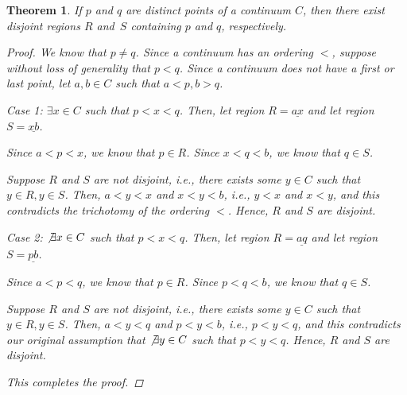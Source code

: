 \documentclass[11pt]{article}
\renewcommand{\_}[1]{\underline{ #1 }}
\newtheorem{theorem}{Theorem}[section]
\theoremstyle{definition}
\numberwithin{equation}{subsection}
\begin{document}
\begin{theorem}  If $p$ and $q$ are distinct points of a continuum $C$, then there exist disjoint regions $R$ and~$S$ containing $p$ and $q$, respectively.

\begin{proof}
We know that $p \not= q$. Since a continuum has an ordering $<$, suppose without loss of generality that $p < q$. Since a continuum does not have a first or last point, let $a,b \in C$ such that $a<p,b>q$.

Case 1: $\exists x \in C$ such that $p<x<q$. Then, let region $R = \_{ax}$ and let region $S = \_{xb}$. 

Since $a<p<x$, we know that $p \in R$. Since $x<q<b$, we know that $q \in S$. 

Suppose $R$ and $S$ are not disjoint, i.e., there exists some $y \in C$ such that $y \in R, y \in S$. Then, $a<y<x$ and $x<y<b$, i.e., $y<x$ and $x<y$, and this contradicts the trichotomy of the ordering $<$. Hence, $R$ and $S$ are disjoint.

Case 2: $\not\exists x \in C$ such that $p<x<q$. Then, let region $R = \_{aq}$ and let region $S = \_{pb}$.

Since $a<p<q$, we know that $p \in R$. Since $p<q<b$, we know that $q \in S$. 

Suppose $R$ and $S$ are not disjoint, i.e., there exists some $y \in C$ such that $y \in R, y \in S$. Then, $a<y<q$ and $p<y<b$, i.e., $p<y<q$, and this contradicts our original assumption that $\not\exists y \in C$ such that $p<y<q$. Hence, $R$ and $S$ are disjoint.

This completes the proof.

\renewcommand\qedsymbol{QED}
\end{proof}

\end{theorem}
\end{document}
